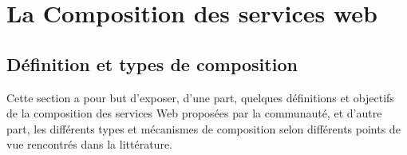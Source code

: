\chapter{La Composition des services web}

  

  
  

\newpage

  \section{Définition et types de composition}
  \label{sec:defin-et-caract}

  Cette section a pour but d'exposer, d'une part, quelques définitions
  et objectifs de la composition des services Web proposées par la
  communauté, et d'autre part, les différents types et mécanismes de
  composition selon différents points de vue rencontrés dans la
  littérature.
  
